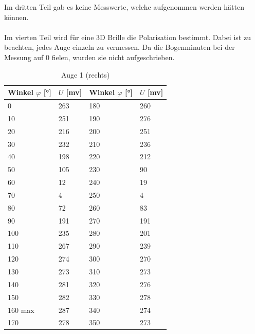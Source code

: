 \documentclass[12pt,a4paper,twoside]{article}
\begin{document}
\noindent
Im dritten Teil gab es keine Messwerte, welche aufgenommen werden hätten können. \\
\\
Im vierten Teil wird für eine 3D Brille die Polarisation bestimmt. Dabei ist zu beachten, jedes Auge einzeln zu vermessen. 
Da die Bogenminuten bei der Messung auf 0 fielen, wurden sie nicht aufgeschrieben. 
\begin{table}[H]
    \centering
    \caption{Auge 1 (rechts)}
    \label{tab:Messdaten Auge rechts}
    \begin{tabular}{| l | l | l | l |}
        \hline
        Winkel $\varphi$ [°] & $U$ [mv] & Winkel $\varphi$ [°] & $U$ [mv] \\
        \hline
        0    & 263  & 180   & 260  \\
        10   & 251  & 190   & 276  \\
        20   & 216  & 200   & 251  \\
        30   & 232  & 210   & 236  \\
        40   & 198  & 220   & 212  \\
        50   & 105  & 230   & 90  \\
        60   & 12   & 240   & 19  \\
        70   & 4    & 250   & 4  \\
        80   & 72   & 260   & 83  \\
        90   & 191  & 270   & 191  \\
        100  & 235  & 280   & 201  \\
        110  & 267  & 290   & 239  \\
        120  & 274  & 300   & 270  \\
        130  & 273  & 310   & 273  \\
        140  & 281  & 320   & 276  \\
        150  & 282  & 330   & 278  \\
        160 max  & 287  & 340   & 274  \\
        170  & 278  & 350   & 273  \\
        \hline
    \end{tabular}
\end{table}
\end{document}
